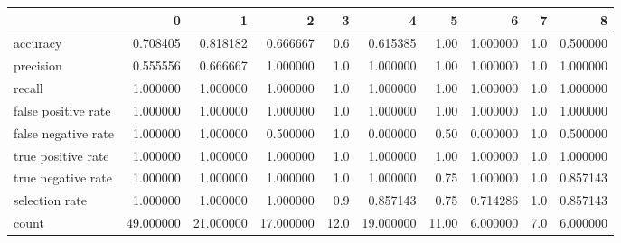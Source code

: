 \begin{tabular}{lrrrrrrrrr}
\toprule
{} &          0 &          1 &          2 &     3 &          4 &      5 &         6 &    7 &         8 \\
\midrule
accuracy            &   0.708405 &   0.818182 &   0.666667 &   0.6 &   0.615385 &   1.00 &  1.000000 &  1.0 &  0.500000 \\
precision           &   0.555556 &   0.666667 &   1.000000 &   1.0 &   1.000000 &   1.00 &  1.000000 &  1.0 &  1.000000 \\
recall              &   1.000000 &   1.000000 &   1.000000 &   1.0 &   1.000000 &   1.00 &  1.000000 &  1.0 &  1.000000 \\
false positive rate &   1.000000 &   1.000000 &   1.000000 &   1.0 &   1.000000 &   1.00 &  1.000000 &  1.0 &  1.000000 \\
false negative rate &   1.000000 &   1.000000 &   0.500000 &   1.0 &   0.000000 &   0.50 &  0.000000 &  1.0 &  0.500000 \\
true positive rate  &   1.000000 &   1.000000 &   1.000000 &   1.0 &   1.000000 &   1.00 &  1.000000 &  1.0 &  1.000000 \\
true negative rate  &   1.000000 &   1.000000 &   1.000000 &   1.0 &   1.000000 &   0.75 &  1.000000 &  1.0 &  0.857143 \\
selection rate      &   1.000000 &   1.000000 &   1.000000 &   0.9 &   0.857143 &   0.75 &  0.714286 &  1.0 &  0.857143 \\
count               &  49.000000 &  21.000000 &  17.000000 &  12.0 &  19.000000 &  11.00 &  6.000000 &  7.0 &  6.000000 \\
\bottomrule
\end{tabular}
